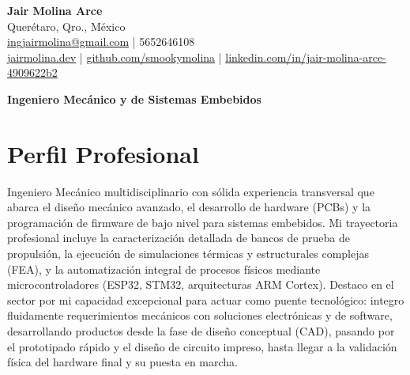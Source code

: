\documentclass[10pt,letterpaper]{article}
\begin{document}
\begin{center}
    {\LARGE \textbf{Jair Molina Arce}} \\ \vspace{0.5ex}
    Querétaro, Qro., México \\
    \href{mailto:ingjairmolina@gmail.com}{ingjairmolina@gmail.com} | 5652646108 \\
    \href{https://jairmolina.dev}{jairmolina.dev} | \href{https://github.com/smookymolina}{github.com/smookymolina} | \href{https://linkedin.com/in/jair-molina-arce-4909622b2}{linkedin.com/in/jair-molina-arce-4909622b2}
\end{center}

\vspace{1ex}

\begin{center}
    {\Large \textbf{Ingeniero Mecánico y de Sistemas Embebidos}}
\end{center}

\section*{Perfil Profesional}
Ingeniero Mecánico multidisciplinario con sólida experiencia transversal que abarca el diseño mecánico avanzado, el desarrollo de hardware (PCBs) y la programación de firmware de bajo nivel para sistemas embebidos. Mi trayectoria profesional incluye la caracterización detallada de bancos de prueba de propulsión, la ejecución de simulaciones térmicas y estructurales complejas (FEA), y la automatización integral de procesos físicos mediante microcontroladores (ESP32, STM32, arquitecturas ARM Cortex). Destaco en el sector por mi capacidad excepcional para actuar como puente tecnológico: integro fluidamente requerimientos mecánicos con soluciones electrónicas y de software, desarrollando productos desde la fase de diseño conceptual (CAD), pasando por el prototipado rápido y el diseño de circuito impreso, hasta llegar a la validación física del hardware final y su puesta en marcha.
\end{document}
